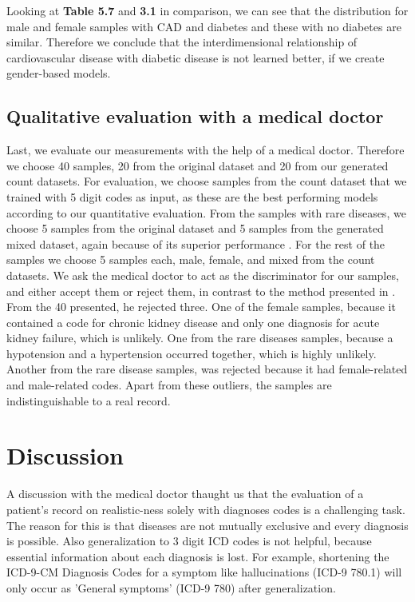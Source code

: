 \documentclass[11pt, a4paper, oneside]{book}
\begin{document}
Looking at \textbf{Table 5.7} and \textbf{3.1} in comparison, we can see that the distribution for male and female samples with CAD and diabetes and these with no diabetes are similar. Therefore we conclude that the interdimensional relationship of cardiovascular disease with diabetic disease is not learned better, if we create gender-based models.

\subsection{Qualitative evaluation with a medical doctor}
Last, we evaluate our measurements with the help of a medical doctor. Therefore we choose 40 samples, 20 from the original dataset and 20 from our generated count datasets. For evaluation, we choose samples from the count dataset that we trained with 5 digit codes as input, as these are the best performing models according to our quantitative evaluation. From the samples with rare diseases, we choose 5 samples from the original dataset and 5 samples from the generated mixed dataset, again because of its superior performance . For the rest of the samples we choose 5 samples each, male, female, and mixed from the count datasets.
We ask the medical doctor to act as the discriminator for our samples, and either accept them or reject them, in contrast to the method presented  in \citep{Choi2017}. From the 40 presented, he rejected three.
One of the female samples, because it contained a code for chronic kidney disease and only one diagnosis for acute kidney failure, which is unlikely. One from the rare diseases samples, because a hypotension and a hypertension occurred together, which is highly unlikely. Another from the rare disease samples, was rejected because it had female-related and male-related codes.
Apart from these outliers, the samples are indistinguishable to a real record.


\section{Discussion}
A discussion with the medical doctor thaught us that the evaluation of a patient's record on realistic-ness solely with diagnoses codes is a challenging task. The reason for this is that diseases are not mutually exclusive and every diagnosis is possible. Also generalization to 3 digit ICD codes is not helpful, because essential information about each diagnosis is lost. For example, shortening the ICD-9-CM Diagnosis Codes for a symptom like hallucinations (ICD-9 780.1) will only occur as 'General symptoms' (ICD-9 780) after generalization. 
\end{document}
